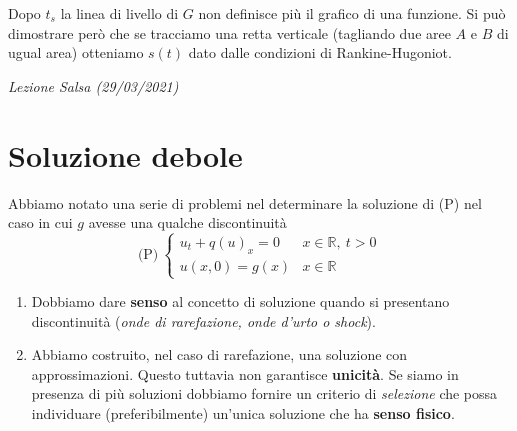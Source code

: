\documentclass[10pt,a4paper,twoside,openright]{book}
\newcounter{conteggioS}
\newcommand{\LezioneS}[1]{
	\stepcounter{conteggioS}
	\textit{Lezione Salsa \arabic{conteggioS} (#1)}
	}
\begin{document}
Dopo $\displaystyle t_{s}$ la linea di livello di $\displaystyle G$ non definisce più il grafico di una funzione.
Si può dimostrare però che se tracciamo una retta verticale (tagliando due aree $\displaystyle A$ e $\displaystyle B$ di ugual area) otteniamo $\displaystyle s( t)$ dato dalle condizioni di Rankine-Hugoniot.


\LezioneS{29/03/2021}
\section{Soluzione debole}

Abbiamo notato una serie di problemi nel determinare la soluzione di (P) nel caso in cui $g$ avesse una qualche discontinuità
\begin{equation}
	\text{(P)} \ 
	\begin{cases}
		u_{t} +q( u)_{x} =0 & x\in \mathbb{R} ,\ t >0 \\
		u( x,0) =g( x)      & x\in \mathbb{R}         
	\end{cases}
\end{equation}
\begin{enumerate}
	\item Dobbiamo dare \textbf{senso} al concetto di soluzione quando si presentano discontinuità (\textit{onde di rarefazione, onde d'urto o shock}).
	\item Abbiamo costruito, nel caso di rarefazione, una soluzione con approssimazioni. Questo tuttavia non garantisce \textbf{unicità}. Se siamo in presenza di più soluzioni dobbiamo fornire un criterio di \textit{selezione} che possa individuare (preferibilmente) un'unica soluzione che ha \textbf{senso fisico}.
\end{enumerate}
\end{document}
